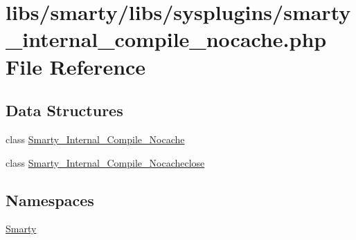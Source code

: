 \hypertarget{smarty__internal__compile__nocache_8php}{}\section{libs/smarty/libs/sysplugins/smarty\+\_\+internal\+\_\+compile\+\_\+nocache.php File Reference}
\label{smarty__internal__compile__nocache_8php}
\subsection*{Data Structures}
\begin{DoxyCompactItemize}
\item 
class \hyperlink{class_smarty___internal___compile___nocache}{Smarty\+\_\+\+Internal\+\_\+\+Compile\+\_\+\+Nocache}
\item 
class \hyperlink{class_smarty___internal___compile___nocacheclose}{Smarty\+\_\+\+Internal\+\_\+\+Compile\+\_\+\+Nocacheclose}
\end{DoxyCompactItemize}
\subsection*{Namespaces}
\begin{DoxyCompactItemize}
\item 
 \hyperlink{namespace_smarty}{Smarty}
\end{DoxyCompactItemize}
